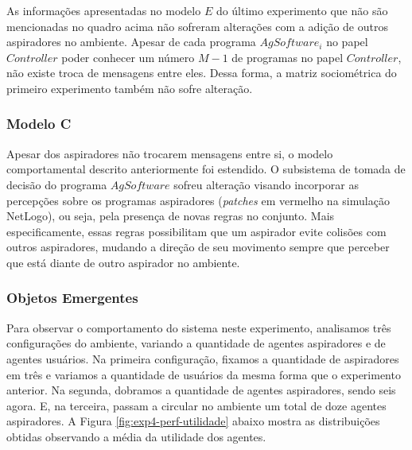 As informações apresentadas no modelo $E$ do último experimento que não são mencionadas no quadro acima não sofreram alterações com a adição  de outros aspiradores no ambiente. Apesar de cada programa $AgSoftware_i$ no papel $Controller$ poder conhecer um número $M-1$ de programas no papel $Controller$, não existe troca de mensagens entre eles. Dessa forma, a matriz sociométrica do primeiro experimento também não sofre alteração. 

\subsubsection{Modelo C}
Apesar dos aspiradores não trocarem mensagens entre si, o modelo comportamental descrito anteriormente foi estendido. O subsistema de tomada de decisão do programa $AgSoftware$ sofreu alteração visando incorporar as percepções sobre os programas aspiradores (\textit{patches} em vermelho na simulação NetLogo), ou seja, pela presença de novas regras no conjunto. Mais especificamente, essas regras possibilitam que um aspirador evite colisões com outros aspiradores, mudando a direção de seu movimento sempre que perceber que está diante de outro aspirador no ambiente.

\subsubsection{Objetos Emergentes}

Para observar o comportamento do sistema neste experimento, analisamos três configurações do ambiente, variando a quantidade de agentes aspiradores e de agentes usuários. Na primeira configuração, fixamos a quantidade de aspiradores em três e variamos a quantidade de usuários da mesma forma que o experimento anterior. Na segunda, dobramos a quantidade de agentes aspiradores, sendo seis agora. E, na terceira, passam a circular no ambiente um total de doze agentes aspiradores. A Figura \ref{fig:exp4-perf-utilidade} abaixo mostra as distribuições obtidas observando a média da utilidade dos agentes. 

\begin{figure}[h!]
    \centering
\end{figure}

